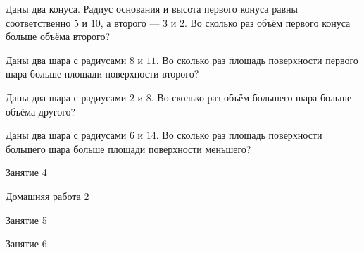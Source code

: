 \begin{class}[number=3]
	\begin{listofex}
		\item Даны два конуса. Радиус основания и высота первого конуса равны соответственно \(5\) и \(10\), а второго --- \(3\) и \(2\). Во сколько раз объём первого конуса больше объёма второго?
		\item Даны два шара с радиусами \(8\) и \(11\). Во сколько раз площадь поверхности первого шара больше площади поверхности второго?
		\item Даны два шара с радиусами \(2\) и \(8\). Во сколько раз объём большего шара больше объёма другого?
		\item Даны два шара с радиусами \(6\) и \(14\). Во сколько раз площадь поверхности большего шара больше площади поверхности меньшего?
		
	\end{listofex}
\end{class}

\begin{class}[number=4]
	\begin{listofex}
		\item Занятие 4
	\end{listofex}
\end{class}

\begin{homework}[number=2]
	\begin{listofex}
		\item Домашняя работа 2
	\end{listofex}
\end{homework}

\begin{class}[number=5]
	\begin{listofex}
		\item Занятие 5
	\end{listofex}
\end{class}

\begin{class}[number=6]
	\begin{listofex}
		\item Занятие 6
	\end{listofex}
\end{class}

